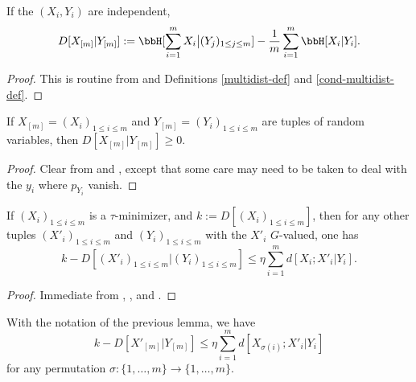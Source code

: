 \begin{lemma}\label{cond-multidist-alt}\leanok
If the $(X_i,Y_i)$ are independent,
  \begin{equation}\label{multi-def-cond}
  D[ X_{[m]} | Y_{[m]}] := \bbH[\sum_{i=1}^m X_i \big| (Y_j)_{1 \leq j \leq m} ] - \frac{1}{m} \sum_{i=1}^m \bbH[ X_i | Y_i].
    \end{equation}
\end{lemma}

\begin{proof}\leanok
  This is routine from  and Definitions \ref{multidist-def} and \ref{cond-multidist-def}.
\end{proof}

\begin{lemma}\label{cond-multidist-nonneg}\leanok If $X_{[m]} = (X_i)_{1 \leq i \leq m}$ and $Y_{[m]} = (Y_i)_{1 \leq i \leq m}$ are tuples of random variables, then $D[ X_{[m]} | Y_{[m]} ] \geq 0$.
\end{lemma}

\begin{proof}\leanok Clear from  and , except that some care may need to be taken to deal with the $y_i$ where $p_{Y_i}$ vanish.
\end{proof}


\begin{lemma}\label{cond-multidist-lower}\leanok  If  $(X_i)_{1 \leq i \leq m}$ is a $\tau$-minimizer, and $k := D[(X_i)_{1 \leq i \leq m}]$, then for any other tuples $(X'_i)_{1 \leq i \leq m}$ and $(Y_i)_{1 \leq i \leq m}$ with the $X'_i$ $G$-valued, one has
  $$ k - D[(X'_i)_{1 \leq i \leq m} | (Y_i)_{1 \leq i \leq m}] \leq \eta \sum_{i=1}^m d[X_i; X'_i|Y_i].$$
\end{lemma}

\begin{proof}\leanok
  Immediate from , , and .
\end{proof}

\begin{corollary}\label{cond-multidist-lower-II}\leanok With the notation of the previous lemma, we have
  \begin{equation}\label{5.3-conv}
    k - D[ X'_{[m]} | Y_{[m]} ] \leq \eta \sum_{i=1}^m d[X_{\sigma(i)};X'_i|Y_i]
  \end{equation}
for any permutation $\sigma : \{1,\dots,m\} \rightarrow \{1,\dots,m\}$.
\end{corollary}


